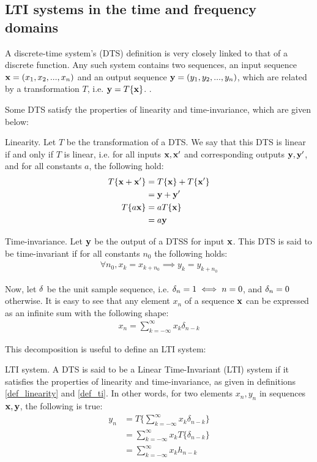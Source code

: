 \documentclass[../main.tex]{subfiles}
\begin{document}
\subsection{LTI systems in the time and frequency domains} \label{subsection_lti} 
A discrete-time system's (DTS) definition is very closely linked to that of a discrete function. Any such system contains two sequences, an input sequence $\mathbf{x} = (x_1, x_2, ..., x_n)$ and an output sequence $\mathbf{y} = (y_1, y_2, ..., y_n)$, which are related by a transformation $T$, i.e. $\mathbf{y} = T\{\mathbf{x}\}$.  \cite{Oppenheim2010}. 
\par Some DTS satisfy the properties of linearity and time-invariance, which are given below:
\begin{definition}{Linearity.} \label{def_linearity}
Let $T$ be the transformation of a DTS. We say that this DTS is linear if and only if $T$ is linear, i.e. for all inputs $\mathbf{x, x}'$ and corresponding outputs $\mathbf{y, y}'$, and for all constants $a$, the following hold:
\begin{align*}
T\{\mathbf{x} + \mathbf{x}'\} &= T\{\mathbf{x}\} + T\{\mathbf{x}'\} \\
&= \mathbf{y} + \mathbf{y}'\\
T\{a\mathbf{x}\} &= aT\{\mathbf{x}\}\\
&= a\mathbf{y}
\end{align*}
\end{definition}
\begin{definition}{Time-invariance.} \label{def_ti}
Let $\mathbf{y}$ be the output of a DTSS for input $\mathbf{x}$. This DTS is said to be time-invariant if for all constants $n_0$ the following holds:
\begin{align*}
\forall n_0, x_k = x_{k+n_0} \implies y_k = y_{k+n_0}
\end{align*}
\end{definition}
\par Now, let $\mathbf{\delta}$ be the unit sample sequence, i.e. $\mathbf{\delta}_n = 1 \iff n = 0$, and $\mathbf{\delta}_n = 0$ otherwise. It is easy to see that any element $x_n$ of a sequence $\mathbf{x}$ can be expressed as an infinite sum with the following shape:
\begin{align*}
x_n = \sum_{k=-\infty}^{\infty}x_k\delta_{n-k}
\end{align*}
\par This decomposition is useful to define an LTI system:
\begin{definition}{LTI system.} \label{def_lti}
A DTS is said to be a Linear Time-Invariant (LTI) system if it satisfies the properties of linearity and time-invariance, as given in definitions \ref{def_linearity} and \ref{def_ti}. In other words, for two elements $x_n, y_n$ in sequences $\mathbf{x, y}$, the following is true:
\begin{align*}
y_n &= T\{\sum_{k=-\infty}^{\infty}x_k\delta_{n-k}\}\\
&= \sum_{k=-\infty}^{\infty}x_kT\{\delta_{n-k}\}\\
&= \sum_{k=-\infty}^{\infty}x_kh_{n-k}
\end{align*}
\end{definition} 
\end{document}
